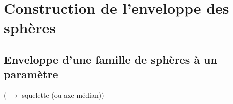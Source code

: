 


\section{Construction de l'enveloppe des sphères}%

\subsection{Enveloppe d'une famille de sphères à un paramètre}
 \cite{monge1809, peternell1997} ( $\to$ squelette (ou axe médian))


